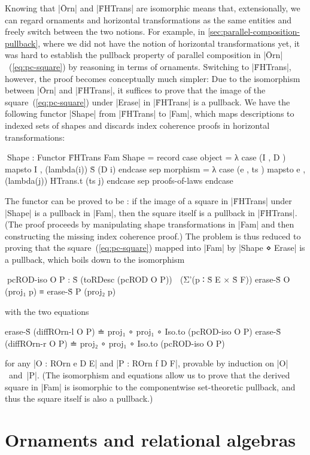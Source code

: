 Knowing that |Ōrn| and |ḞHTrans| are isomorphic means that, extensionally, we can regard ornaments and horizontal transformations as the same entities and freely switch between the two notions.
For example, in \autoref{sec:parallel-composition-pullback}, where we did not have the notion of horizontal transformations yet, it was hard to establish the pullback property of parallel composition in |Ōrn|~(\ref{eq:pc-square}) by reasoning in terms of ornaments.
Switching to |ḞHTrans|, however, the proof becomes conceptually much simpler:
Due to the isomorphism between |Ōrn| and |ḞHTrans|, it suffices to prove that the image of the square~(\ref{eq:pc-square}) under |Erase| in |ḞHTrans| is a pullback.
We have the following functor |Shape| from |ḞHTrans| to |Fam|, which maps descriptions to indexed sets of shapes and discards index coherence proofs in horizontal transformations:
\begin{code}
^^^Shape : Functor ḞHTrans Fam
Shape = record
  case  object    = λ case (I , D   ) mapsto I  , (lambda(i)) Ṡ (D i)            endcase
  sep   morphism  = λ case (e , ts  ) mapsto e  , (lambda({j})) HTrans.t (ts j)  endcase
  sep   proofs-of-laws endcase
\end{code}
The functor can be proved to be : if the image of a square in |ḞHTrans| under |Shape| is a pullback in |Fam|, then the square itself is a pullback in |ḞHTrans|.
(The proof proceeds by manipulating shape transformations in |Fam| and then constructing the missing index coherence proof.)
The problem is thus reduced to proving that the square~(\ref{eq:pc-square}) mapped into |Fam| by |Shape ⋄ Erase| is a pullback, which boils down to the isomorphism
\begin{code}
^^^pcROD-iso O P :  Ṡ (toRDesc (pcROD O P))
                      ≅ (Σ'(p ∶ Ṡ E × Ṡ F)) erase-Ṡ O (proj₁ p) ≡ erase-Ṡ P (proj₂ p)
\end{code}
with the two equations
\begin{code}
erase-Ṡ (diffROrn-l  O P) ≐ proj₁  ∘ proj₁ ∘ Iso.to (pcROD-iso O P)
erase-Ṡ (diffROrn-r  O P) ≐ proj₂  ∘ proj₁ ∘ Iso.to (pcROD-iso O P)
\end{code}
for any |O : ROrn e D E| and |P : ROrn f D F|, provable by induction on |O|~and~|P|.
(The isomorphism and equations allow us to prove that the derived square in |Fam| is isomorphic to the componentwise set-theoretic pullback, and thus the square itself is also a pullback.)

\section{Ornaments and relational algebras}
\label{sec:ornaments-and-relational-algebras}

